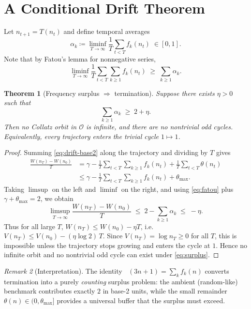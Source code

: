 \documentclass[11pt]{article}
\theoremstyle{plain}
\newtheorem{theorem}{Theorem}[section]
\theoremstyle{definition}
\theoremstyle{remark}
\newtheorem{remark}[theorem]{Remark}
\DeclareMathOperator{\vtwo}{v_2}
\newcommand{\Odd}{\mathcal{O}} %
\newcommand{\Todd}{T} %
\newcommand{\V}{V}
\newcommand{\W}{W}
\newcommand{\1}{\mathbf{1}}
\begin{document}
\section{A Conditional Drift Theorem}
Let $n_{t+1}=\Todd(n_t)$ and define temporal averages
\begin{equation}
  \alpha_k \coloneqq \liminf_{T\to\infty} \frac{1}{T} \sum_{t<T} f_k(n_t) \;\in[0,1].
\end{equation}
Note that by Fatou's lemma for nonnegative series,
\begin{equation}\label{eq:fatou}
  \liminf_{T\to\infty} \frac{1}{T} \sum_{t<T} \sum_{k\ge1} f_k(n_t) \;\ge\; \sum_{k\ge1} \alpha_k.
\end{equation}

\begin{theorem}[Frequency surplus $\Rightarrow$ termination]
Suppose there exists $\eta>0$ such that
\begin{equation}\label{eq:surplus}
  \sum_{k\ge1} \alpha_k \;\ge\; 2+\eta. 
\end{equation}
Then no Collatz orbit in $\Odd$ is infinite, and there are no nontrivial odd cycles. Equivalently, every trajectory enters the trivial cycle $1\mapsto1$.
\end{theorem}
\begin{proof}
Summing \eqref{eq:drift-base2} along the trajectory and dividing by $T$ gives
\begin{align}
  \frac{\W(n_T)-\W(n_0)}{T}
  &= \gamma - \frac{1}{T}\sum_{t<T} \sum_{k\ge1} f_k(n_t) + \frac{1}{T}\sum_{t<T} \theta(n_t) \\
  &\le \gamma - \frac{1}{T}\sum_{t<T} \sum_{k\ge1} f_k(n_t) + \theta_{\max} .
\end{align}
Taking $\limsup$ on the left and $\liminf$ on the right, and using \eqref{eq:fatou} plus $\gamma+\theta_{\max}=2$, we obtain
\begin{equation}
  \limsup_{T\to\infty} \frac{\W(n_T)-\W(n_0)}{T} \;\le\; 2 - \sum_{k\ge1} \alpha_k \;\le\; -\eta.
\end{equation}
Thus for all large $T$, $\W(n_T) \le \W(n_0) - \eta T$, i.e. $\V(n_T) \le \V(n_0) - (\eta\log2)\,T$. Since $\V(n_T)=\log n_T\ge0$ for all $T$, this is impossible unless the trajectory stops growing and enters the cycle at $1$. Hence no infinite orbit and no nontrivial odd cycle can exist under \eqref{eq:surplus}.
\end{proof}

\begin{remark}[Interpretation]
The identity $\vtwo(3n+1)=\sum_k f_k(n)$ converts termination into a purely \emph{counting} surplus problem: the ambient (random-like) benchmark contributes exactly $2$ in base-2 units, while the small remainder $\theta(n)\in(0,\theta_{\max}]$ provides a universal buffer that the surplus must exceed.
\end{remark}
\end{document}
